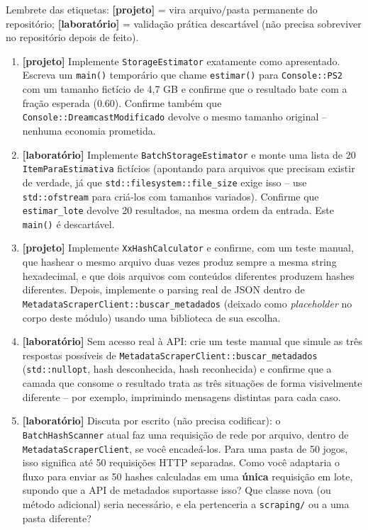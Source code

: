 \begin{CaixaDesafio}
Lembrete das etiquetas: \textbf{[projeto]} = vira arquivo/pasta permanente do repositório; \textbf{[laboratório]} = validação prática descartável (não precisa sobreviver no repositório depois de feito).

\begin{enumerate}[label=\textbf{5.\arabic*}]
    \item \textbf{[projeto]} Implemente \texttt{StorageEstimator} exatamente como apresentado. Escreva um \texttt{main()} temporário que chame \texttt{estimar()} para \texttt{Console::PS2} com um tamanho fictício de 4,7 GB e confirme que o resultado bate com a fração esperada (0.60). Confirme também que \texttt{Console::DreamcastModificado} devolve o mesmo tamanho original -- nenhuma economia prometida.
    \item \textbf{[laboratório]} Implemente \texttt{BatchStorageEstimator} e monte uma lista de 20 \texttt{ItemParaEstimativa} fictícios (apontando para arquivos que precisam existir de verdade, já que \texttt{std::filesystem::file\_size} exige isso -- use \texttt{std::ofstream} para criá-los com tamanhos variados). Confirme que \texttt{estimar\_lote} devolve 20 resultados, na mesma ordem da entrada. Este \texttt{main()} é descartável.
    \item \textbf{[projeto]} Implemente \texttt{XxHashCalculator} e confirme, com um teste manual, que hashear o mesmo arquivo duas vezes produz sempre a mesma string hexadecimal, e que dois arquivos com conteúdos diferentes produzem hashes diferentes. Depois, implemente o parsing real de JSON dentro de \texttt{MetadataScraperClient::buscar\_metadados} (deixado como \textit{placeholder} no corpo deste módulo) usando uma biblioteca de sua escolha.
    \item \textbf{[laboratório]} Sem acesso real à API: crie um teste manual que simule as três respostas possíveis de \texttt{MetadataScraperClient::buscar\_metadados} (\texttt{std::nullopt}, hash desconhecida, hash reconhecida) e confirme que a camada que consome o resultado trata as três situações de forma visivelmente diferente -- por exemplo, imprimindo mensagens distintas para cada caso.
    \item \textbf{[laboratório]} Discuta por escrito (não precisa codificar): o \texttt{BatchHashScanner} atual faz uma requisição de rede por arquivo, dentro de \texttt{MetadataScraperClient}, se você encadeá-los. Para uma pasta de 50 jogos, isso significa até 50 requisições HTTP separadas. Como você adaptaria o fluxo para enviar as 50 hashes calculadas em uma \textbf{única} requisição em lote, supondo que a API de metadados suportasse isso? Que classe nova (ou método adicional) seria necessário, e ela pertenceria a \texttt{scraping/} ou a uma pasta diferente?

\end{enumerate}
\end{CaixaDesafio}
